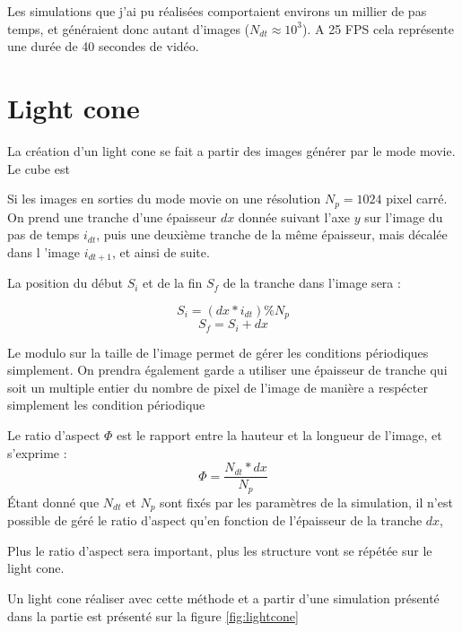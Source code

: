 Les simulations que j'ai pu réalisées comportaient environs un millier de pas temps, et généraient donc autant d'images ($N_{dt} \approx 10^3$).
A 25 FPS cela représente une durée de 40 secondes de vidéo.




\section{Light cone}
La création d'un light cone se fait a partir des images générer par le mode movie.
Le cube est 

Si les images en sorties du mode movie on une résolution $N_p=1024$ pixel carré.
On prend une tranche d'une épaisseur $dx$ donnée suivant l'axe $y$ sur l'image du pas de temps $i_{dt}$, puis une deuxième tranche de la même épaisseur, mais décalée dans l 'image $i_{dt+1}$, et ainsi de suite.

La position du début $S_i$ et de la fin $S_f$ de la tranche dans l'image sera :

\begin{equation}
S_i = (dx * i_{dt}) \% N_p 
\end{equation} 
\begin{equation}
S_f = S_i + dx 
\end{equation} 

Le modulo sur la taille de l'image permet de gérer les conditions périodiques simplement.
On prendra également garde a utiliser une épaisseur de tranche qui soit un multiple entier du nombre de pixel de l'image de manière a respécter simplement les condition périodique

Le ratio d'aspect $\Phi$ est le rapport entre la hauteur et la longueur de l'image, et s'exprime :
\begin{equation}
\Phi = \frac{ N_{dt} * dx}{N_p}
\end{equation}
Étant donné que $N_{dt}$ et $N_p$ sont fixés par les paramètres de la simulation, il n'est possible de géré le ratio d'aspect qu'en fonction de l'épaisseur de la tranche $dx$, 

Plus le ratio d'aspect sera important, plus les structure vont se répétée sur le light cone.

Un light cone réaliser avec cette méthode et a partir d'une simulation présenté dans la partie %
est présenté sur la figure \ref{fig:lightcone}


